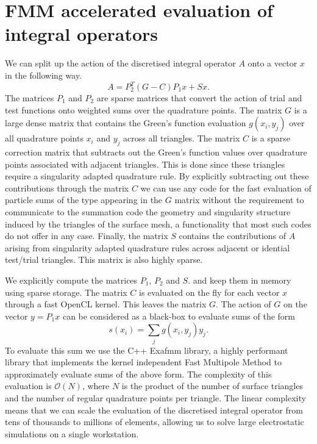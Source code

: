 \section{FMM accelerated evaluation of integral operators}
We can split up the action of the discretised integral operator $A$ onto a vector $x$ in the following way.
$$
A = P_2^T (G - C)P_1x + Sx.
$$
The matrices $P_1$ and $P_2$ are sparse matrices that convert the action of trial and test functions onto weighted sums over the quadrature points. The matrix $G$ is a large dense matrix that contains the Green's function evaluation $g(x_i, y_j)$ over all quadrature points $x_i$ and $y_j$ across all triangles. The matrix $C$ is a sparse correction matrix that subtracts out the Green's function values over quadrature points associated with  adjacent triangles. This is done since these triangles require a singularity adapted quadrature rule. By explicitly subtracting out these contributions through the matrix $C$ we can use any code for the fast evaluation of particle sums of the type appearing in the $G$ matrix without the requirement to communicate to the summation code the geometry and singularity structure induced by the triangles of the surface mesh, a functionality that most such codes do not offer in any case. Finally, the matrix $S$ contains the contributions of $A$ arising from singularity adapted quadrature rules across adjacent or idential test/trial triangles. This matrix is also highly sparse.

We explicitly compute the matrices $P_1$, $P_2$ and $S$. and keep them in memory using sparse storage. The matrix $C$ is evaluated on the fly for each vector $x$ through a fast OpenCL kernel. This leaves the matrix $G$. The action of $G$ on the vector $y=P_1x$ can be considered as a black-box to evaluate sums of the form
$$
s(x_i) = \sum_jg(x_i, y_j)y_j.
$$
To evaluate this sum we use the C++ Exafmm library, a highly performant library that implements the kernel independent Fast Multipole Method to approximately evaluate sums of the above form. The complexity of this evaluation is $\mathcal{O}(N)$, where $N$ is the product of the number of surface triangles and the number of regular quadrature points per triangle. The linear complexity means that we can scale the evaluation of the discretised integral operator from tens of thousands to millions of elements, allowing us to solve large  electrostatic simulations on a single workstation.